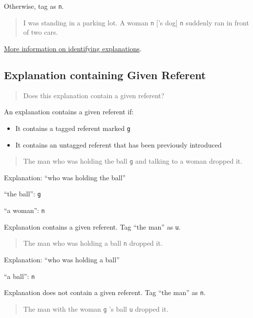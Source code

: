 \documentclass[
]{book}
\providecommand{\tightlist}{%
  \setlength{\itemsep}{0pt}\setlength{\parskip}{0pt}}
\begin{document}
Otherwise, tag as \texttt{n}.

\begin{quote}
I was standing in a parking lot. A woman \texttt{n} {[}'s dog{]} \texttt{n} suddenly ran in front of two cars.
\end{quote}

\protect\hyperlink{referent-explanations}{More information on identifying explanations}.

\hypertarget{explanation-containing-given-referent}{%
\subsection{Explanation containing Given Referent}\label{explanation-containing-given-referent}}

\begin{quote}
Does this explanation contain a given referent?
\end{quote}

An explanation contains a given referent if:

\begin{itemize}
\tightlist
\item
  It contains a tagged referent marked \texttt{g}
\item
  It contains an untagged referent that has been previously introduced
\end{itemize}

\begin{quote}
The man who was holding the ball \texttt{g} and talking to a woman dropped it.
\end{quote}

Explanation: ``who was holding the ball''

``the ball'': \texttt{g}

``a woman'': \texttt{n}

Explanation contains a given referent.
Tag ``the man'' as \texttt{u}.

\begin{quote}
The man who was holding a ball \texttt{n} dropped it.
\end{quote}

Explanation: ``who was holding a ball''

``a ball'': \texttt{n}

Explanation does not contain a given referent.
Tag ``the man'' as \texttt{n}.

\begin{quote}
The man with the woman \texttt{g} 's ball \texttt{u} dropped it.
\end{quote}
\end{document}
